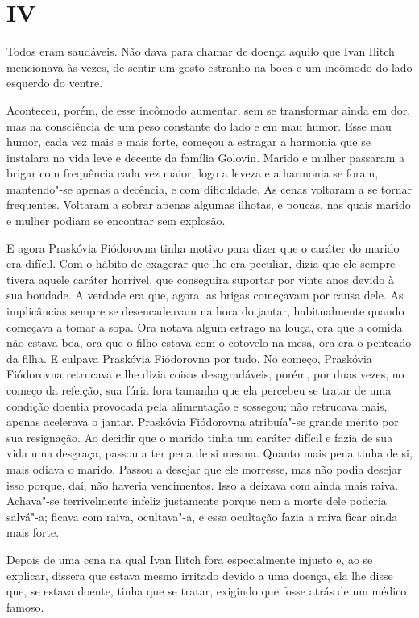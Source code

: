 \section*{IV}

Todos eram saudáveis. Não dava para chamar de doença aquilo que Ivan
Ilitch mencionava às vezes, de sentir um gosto estranho na boca e um
incômodo do lado esquerdo do ventre.

Aconteceu, porém, de esse incômodo aumentar, sem se transformar ainda em
dor, mas na consciência de um peso constante do lado e em mau humor.
Esse mau humor, cada vez mais e mais forte, começou a estragar a
harmonia que se instalara na vida leve e decente da família Golovin.
Marido e mulher passaram a brigar com frequência cada vez maior, logo a
leveza e a harmonia se foram, mantendo"-se apenas a decência, e com
dificuldade. As cenas voltaram a se tornar frequentes. Voltaram a sobrar
apenas algumas ilhotas, e poucas, nas quais marido e mulher podiam se
encontrar sem explosão.

E agora Praskóvia Fiódorovna tinha motivo para dizer que o caráter do
marido era difícil. Com o hábito de exagerar que lhe era peculiar, dizia
que ele sempre tivera aquele caráter horrível, que conseguira suportar
por vinte anos devido à sua bondade. A verdade era que, agora, as brigas
começavam por causa dele. As implicâncias sempre se desencadeavam na
hora do jantar, habitualmente quando começava a tomar a sopa. Ora notava
algum estrago na louça, ora que a comida não estava boa, ora que o filho
estava com o cotovelo na mesa, ora era o penteado da filha. E culpava
Praskóvia Fiódorovna por tudo. No começo, Praskóvia Fiódorovna retrucava
e lhe dizia coisas desagradáveis, porém, por duas vezes, no começo da
refeição, sua fúria fora tamanha que ela percebeu se tratar de uma
condição doentia provocada pela alimentação e sossegou; não retrucava
mais, apenas acelerava o jantar. Praskóvia Fiódorovna atribuía"-se grande
mérito por sua resignação. Ao decidir que o marido tinha um caráter
difícil e fazia de sua vida uma desgraça, passou a ter pena de si mesma.
Quanto mais pena tinha de si, mais odiava o marido. Passou a desejar que
ele morresse, mas não podia desejar isso porque, daí, não haveria
vencimentos. Isso a deixava com ainda mais raiva. Achava"-se
terrivelmente infeliz justamente porque nem a morte dele poderia
salvá"-a; ficava com raiva, ocultava"-a, e essa ocultação fazia a raiva
ficar ainda mais forte.

Depois de uma cena na qual Ivan Ilitch fora especialmente injusto e, ao
se explicar, dissera que estava mesmo irritado devido a uma doença, ela
lhe disse que, se estava doente, tinha que se tratar, exigindo que fosse
atrás de um médico famoso.

